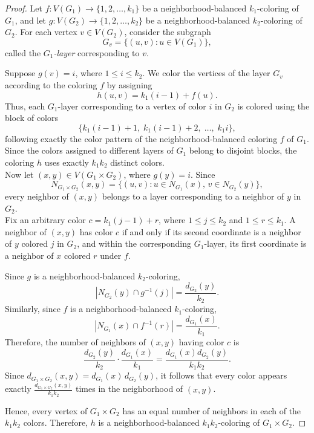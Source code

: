 \documentclass[12pt]{article}
\def\ni{\noindent}
\begin{document}
\begin{proof}
Let
$f:V(G_1)\rightarrow \{1,2,\ldots,k_1\}$
be a neighborhood-balanced $k_1$-coloring of $G_1$, and let
$g:V(G_2)\rightarrow \{1,2,\ldots,k_2\}$
be a neighborhood-balanced $k_2$-coloring of $G_2$.
For each vertex $v\in V(G_2)$, consider the subgraph
\[
G_v=\{(u,v):u\in V(G_1)\},
\]
called the \emph{$G_1$-layer} corresponding to $v$.

\ni Suppose $g(v)=i$, where $1\le i\le k_2$. We color the vertices of the layer $G_v$ according to the coloring $f$ by assigning
\[
h(u,v)=k_1(i-1)+f(u).
\]
Thus, each $G_1$-layer corresponding to a vertex of color $i$ in $G_2$ is colored using the block of colors
\[
\{k_1(i-1)+1,\;k_1(i-1)+2,\;\ldots,\;k_1i\},
\]
following exactly the color pattern of the neighborhood-balanced coloring $f$ of $G_1$.
 Since the colors assigned to different layers of $G_1$ belong to disjoint blocks, the coloring $h$ uses exactly $k_1k_2$ distinct colors.\\
Now let $(x,y)\in V(G_1\times G_2)$, where $g(y)=i$. Since
\[
N_{G_1\times G_2}(x,y)
=
\{(u,v):u\in N_{G_1}(x),\,v\in N_{G_2}(y)\},
\]
every neighbor of $(x,y)$ belongs to a layer corresponding to a neighbor of $y$ in $G_2$.\\
\ni 
Fix an arbitrary color
$
c=k_1(j-1)+r$,
where $1\le j\le k_2$ and $1\le r\le k_1$.
A neighbor of $(x,y)$ has color $c$ if and only if its second coordinate is a neighbor of $y$ colored $j$ in $G_2$, and within the corresponding $G_1$-layer, its first coordinate is a neighbor of $x$ colored $r$ under $f$.

\ni
Since $g$ is a neighborhood-balanced $k_2$-coloring,
\[
\left|N_{G_2}(y)\cap g^{-1}(j)\right|
=
\frac{d_{G_2}(y)}{k_2}.
\]
Similarly, since $f$ is a neighborhood-balanced $k_1$-coloring,
\[
\left|N_{G_1}(x)\cap f^{-1}(r)\right|
=
\frac{d_{G_1}(x)}{k_1}.
\]
\ni
Therefore, the number of neighbors of $(x,y)$ having color $c$ is
\[
\frac{d_{G_2}(y)}{k_2}
\cdot
\frac{d_{G_1}(x)}{k_1}
=
\frac{d_{G_1}(x)d_{G_2}(y)}{k_1k_2}.
\]
\ni
Since
$d_{G_1\times G_2}(x,y)
=
d_{G_1}(x)\,d_{G_2}(y)$,
it follows that every color appears exactly
$\frac{d_{G_1\times G_2}(x,y)}{k_1k_2}$
times in the neighborhood of $(x,y)$.

\ni Hence, every vertex of $G_1\times G_2$ has an equal number of neighbors in each of the $k_1k_2$ colors. Therefore, $h$ is a neighborhood-balanced $k_1k_2$-coloring of $G_1\times G_2$.
\end{proof}
\end{document}
